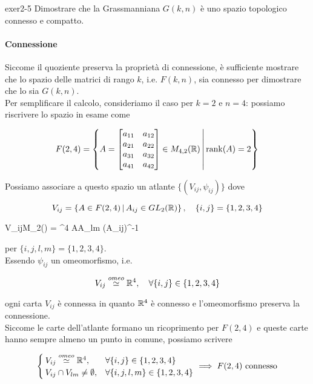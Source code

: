 {exer2-5}
{
Dimostrare che la Grassmanniana $ G(k,n) $ è uno spazio topologico connesso e compatto.
}
{
\paragraph{Connessione}

Siccome il quoziente preserva la proprietà di connessione, è sufficiente mostrare che lo spazio delle matrici di rango $ k $, i.e. $ F(k,n) $, sia connesso per dimostrare che lo sia $ G(k,n) $. \\
Per semplificare il calcolo, consideriamo il caso per $ k = 2 $ e $ n = 4 $: possiamo riscrivere lo spazio in esame come

\begin{equation}
	F(2,4) = \left\{ A = \bmqty{ a_{11} & a_{12} \\ a_{21} & a_{22} \\ a_{31} & a_{32} \\ a_{41} & a_{42} } \in M_{4,2}(\R) \st \rank(A) = 2 \right\}
\end{equation}

Possiamo associare a questo spazio un atlante $ \{(V_{ij},\psi_{ij})\} $ dove

\begin{equation}
	V_{ij} = \left\{ A \in F(2,4) \st A_{ij} \in GL_{2}(\R) \right\} %
	\qcomma \{i,j\} = \{1,2,3,4\}
\end{equation}

	{V_{ij}}{M_{2}(\R) = \R^{4}}
	{A}{A_{lm} (A_{ij})^{-1}}

per $ \{i,j,l,m\} = \{1,2,3,4\} $. \\
Essendo $ \psi_{ij} $ un omeomorfismo, i.e.

\begin{equation}
	V_{ij} \stackrel{omeo}{\simeq} \R^{4} \qcomma \forall \{i,j\} \in \{1,2,3,4\}
\end{equation}

ogni carta $ V_{ij} $ è connessa in quanto $ \mathbb{R}^{4} $ è connesso e l'omeomorfismo preserva la connessione. \\
Siccome le carte dell'atlante formano un ricoprimento per $ F(2,4) $ e queste carte hanno sempre almeno un punto in comune, possiamo scrivere

\begin{equation}
	\begin{cases}
		V_{ij} \stackrel{omeo}{\simeq} \R^{4}, & \forall \{i,j\} \in \{1,2,3,4\} \\
		V_{ij} \cap V_{lm} \neq \emptyset, & \forall \{i,j,l,m\} \in \{1,2,3,4\}
	\end{cases} %
	\implies %
	F(2,4) \text{ connesso}
\end{equation}

}
